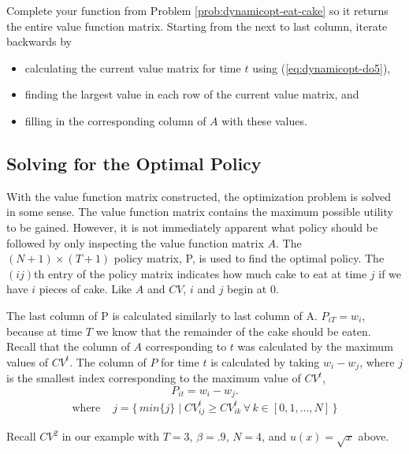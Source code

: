 \begin{problem}
Complete your function from Problem \ref{prob:dynamicopt-eat-cake} so it returns the entire value function matrix.
Starting from the next to last column, iterate backwards by
\begin{itemize}
\item calculating the current value matrix for time $t$ using (\ref{eq:dynamicopt-do5}),
\item finding the largest value in each row of the current value matrix, and
\item filling in the corresponding column of $A$ with these values.
\end{itemize}
\end{problem}

\subsection*{Solving for the Optimal Policy} %

With the value function matrix constructed, the optimization problem is solved in some sense.
The value function matrix contains the maximum possible utility to be gained.
However, it is not immediately apparent what policy should be followed by only inspecting the value function matrix $A$.
The $(N+1) \times (T+1)$ policy matrix, P, is used to find the optimal policy.
The $(ij)$th entry of the policy matrix indicates how much cake to eat at time $j$ if we have $i$ pieces of cake.
Like $A$ and $CV$, $i$ and $j$ begin at $0$.

The last column of P is calculated similarly to last column of A.
$P_{iT} = w_i$, because at time $T$ we know that the remainder of the cake should be eaten.
Recall that the column of $A$ corresponding to $t$ was calculated by the maximum values of $CV^{t}$.
The column of $P$ for time $t$ is calculated by taking $w_i - w_j$, where $j$ is the smallest index corresponding to the maximum value of $CV^{t}$,
\[
P_{it} = w_i - w_j.
\]
\begin{align*}
\mbox{where} \, \, & j = \{\, min\{j\} \mid CV_{ij}^t \geq CV_{ik}^t \, \forall \, k \in \left[0,1, \ldots , N \right] \,\}
\end{align*}

Recall $CV^2$ in our example with $T=3$, $\beta=.9$, $N=4$, and $u(x) = \sqrt{x}$ above.

